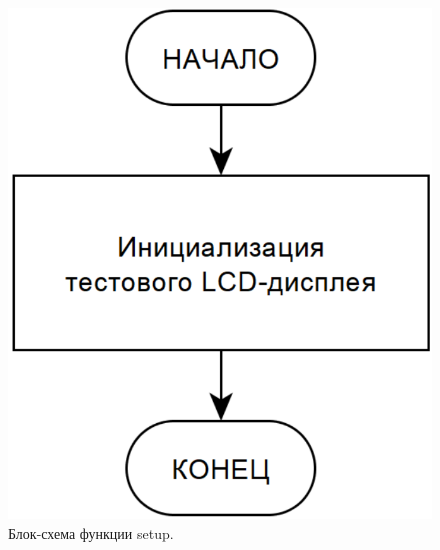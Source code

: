 \begin{figure}[H]
    \centering
    \includegraphics[scale=0.3]{setup.png}
    \caption{Блок-схема функции setup.}
    \label{fig:setup}
\end{figure}

